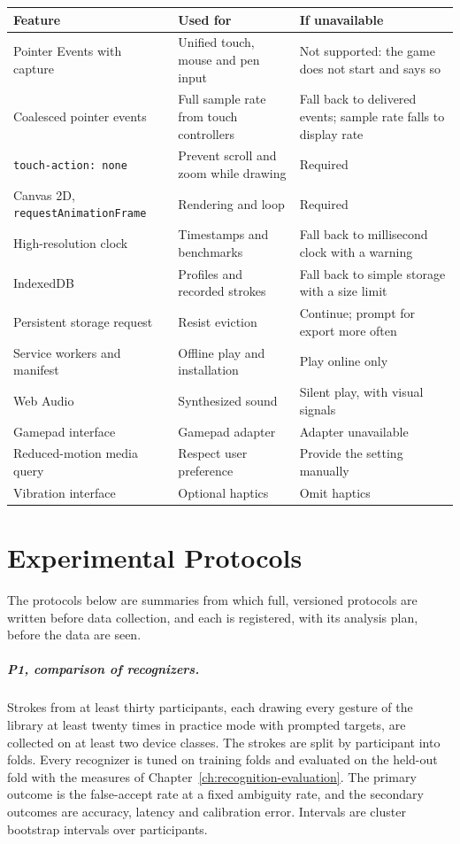 \begin{table}[h]
\centering
\small
\begin{tabularx}{\textwidth}{@{}lXX@{}}
\toprule
Feature & Used for & If unavailable \\
\midrule
Pointer Events with capture & Unified touch, mouse and pen input & Not supported: the game does not start and says so \\
Coalesced pointer events & Full sample rate from touch controllers & Fall back to delivered events; sample rate falls to display rate \\
\texttt{touch-action: none} & Prevent scroll and zoom while drawing & Required \\
Canvas 2D, \texttt{requestAnimationFrame} & Rendering and loop & Required \\
High-resolution clock & Timestamps and benchmarks & Fall back to millisecond clock with a warning \\
IndexedDB & Profiles and recorded strokes & Fall back to simple storage with a size limit \\
Persistent storage request & Resist eviction & Continue; prompt for export more often \\
Service workers and manifest & Offline play and installation & Play online only \\
Web Audio & Synthesized sound & Silent play, with visual signals \\
Gamepad interface & Gamepad adapter & Adapter unavailable \\
Reduced-motion media query & Respect user preference & Provide the setting manually \\
Vibration interface & Optional haptics & Omit haptics \\
\bottomrule
\end{tabularx}
\end{table}

\chapter{Experimental Protocols}\label{app:protocols}

The protocols below are summaries from which full, versioned protocols are written before data collection, and each is registered, with its analysis plan, before the data are seen.

\paragraph{P1, comparison of recognizers.} Strokes from at least thirty participants, each drawing every gesture of the library at least twenty times in practice mode with prompted targets, are collected on at least two device classes. The strokes are split by participant into folds. Every recognizer is tuned on training folds and evaluated on the held-out fold with the measures of Chapter~\ref{ch:recognition-evaluation}. The primary outcome is the false-accept rate at a fixed ambiguity rate, and the secondary outcomes are accuracy, latency and calibration error. Intervals are cluster bootstrap intervals over participants.

